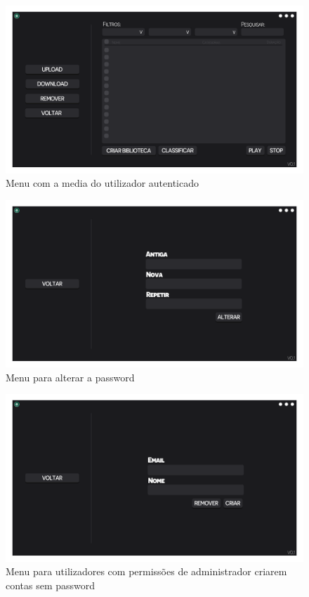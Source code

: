 \documentclass[a4paper]{report}
\begin{document}
\begin{figure}[H]
	\centering 
    \includegraphics[width=\textwidth]{images/MyMedia_Menu.png}  
    \caption{Menu com a media do utilizador autenticado}
\end{figure}

\begin{figure}[H]
	\centering 
    \includegraphics[width=\textwidth]{images/AlterarPassword_Menu.png}  
    \caption{Menu para alterar a password}
\end{figure}

\begin{figure}[H]
	\centering 
    \includegraphics[width=\textwidth]{images/CriarConta_Menu.png}  
    \caption{Menu para utilizadores com permissões de administrador criarem contas sem password}
\end{figure}
\end{document}
